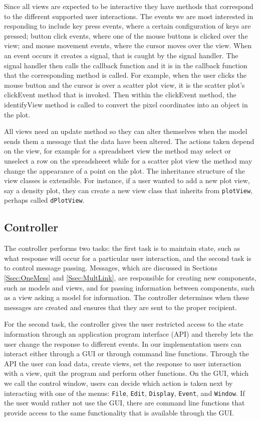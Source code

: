 \documentclass[11pt]{article}
\newcommand{\Rfunction}[1]{{\textsf{#1}}}
\newcommand{\Rclass}[1]{\texttt{#1}}
\begin{document}
Since all views are expected to be interactive they have methods that
correspond to the different supported user interactions.  The events
we are most interested in responding to include key press events,
where a certain configuration of keys are pressed; button click
events, where one of the mouse buttons is clicked over the view; and
mouse movement events, where the cursor moves over the view.  When an
event occurs it creates a signal, that is caught by the signal
handler.  The signal handler then calls the callback function and it
is in the callback function that the corresponding method is called.
For example, when the user clicks the mouse button and the cursor is
over a scatter plot view, it is the scatter plot's
\Rfunction{clickEvent} method that is invoked.  Then within the
\Rfunction{clickEvent} method, the \Rfunction{identifyView} method is called
to convert the pixel coordinates into an object in the plot.

All views need an update method so they can alter themselves when the
model sends them a message that the data have been altered. The
actions taken depend on the view, for example for a spreadsheet view
the method may select or unselect a row on the spreadsheeet while for
a scatter plot view the method may change the appearance of a point on
the plot.  The inheritance structure of the view classes is
extensible.  For instance, if a user wanted to add a new plot view,
say a density plot, they can create a new view class that inherits
from \Rclass{plotView}, perhaps called \Rclass{dPlotView}.

\subsection{Controller}
\label{Ssec:OneCont}

The controller performs two tasks: the first task is to maintain state,
such as what response will occur for a particular user interaction, 
and the second task is to control message passing.  Messages, which are
discussed in Sections \ref{Ssec:OneMess} and \ref{Ssec:MultLink}, are
responsible for creating new components, such as models and views, and for
passing information between components, such as a view asking a model for
information.  The controller determines when these messages are created and
ensures that they are sent to the proper recipient.

For the second task, the controller gives the user restricted access
to the state information through an application program interface
(API) and thereby lets the user change the response to different events. 
In our implementation users can interact either through a GUI
or through command line functions.  Through the API the user can load
data, create views, set the response to user interaction with a view,
quit the program and perform other functions.  On the GUI, which we call the
control window, users can decide which action is taken next by interacting
with one of the menus: \texttt{File}, \texttt{Edit},
\texttt{Display}, \texttt{Event}, and \texttt{Window}.  If the user
would rather not use the GUI, there are command line functions that
provide access to the same functionality that is available through the
GUI.  
\end{document}
